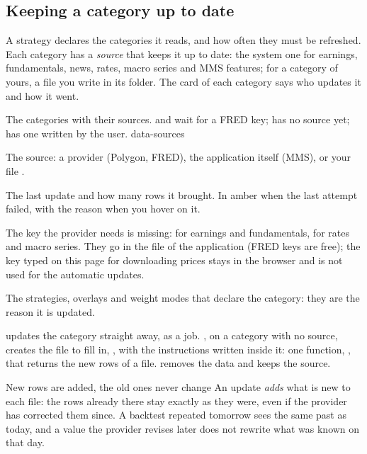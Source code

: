 \subsection{Keeping a category up to date}\label{sez:data-sources}

A strategy declares the categories it reads, and how often they must be
refreshed. Each category has a \emph{source} that keeps it up to date: the
system one for earnings, fundamentals, news, rates, macro series and MMS
features; for a category of yours, a file you write in its folder. The card
of each category says who updates it and how it went.

  {The categories with their sources.  and  wait for
   a FRED key;  has no source yet;  has one
   written by the user.}
  {data-sources}

\begin{description}[leftmargin = 1.4em, style = nextline, itemsep = 4pt]
  \item[\voce{Updated by}] The source: a provider (Polygon, FRED), the
    application itself (MMS), or your file .
  \item[\voce{Checked \ldots{} ago}] The last update and how many rows it
    brought. In amber when the last attempt failed, with the reason when you
    hover on it.
  \item[\voce{Needs \ldots{} in the .env of the app}] The key the provider
    needs is missing:  for earnings and
    fundamentals,  for rates and macro series. They go
    in the  file of the application (FRED keys are free); the key
    typed on this page for downloading prices stays in the browser and is not
    used for the automatic updates.
  \item[\voce{Read by}] The strategies, overlays and weight modes that
    declare the category: they are the reason it is updated.
\end{description}

\noindent
{} updates the category straight away, as a job.
, on a category with no source, creates the
file to fill in, , with the instructions
written inside it: one function, , that returns the new rows of a
file.  removes the data and keeps the source.

\begin{nota}{New rows are added, the old ones never change}
An update \emph{adds} what is new to each file: the rows already there stay
exactly as they were, even if the provider has corrected them since. A
backtest repeated tomorrow sees the same past as today, and a value the
provider revises later does not rewrite what was known on that day.
\end{nota}

